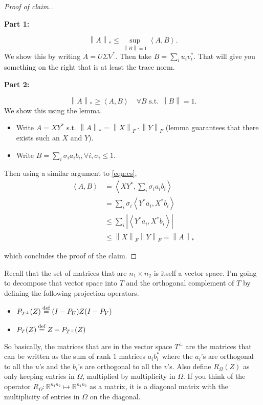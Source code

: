 \documentclass[11pt]{article}
\newcommand{\inprod}[1]{\left\langle #1 \right\rangle}
\newcommand{\eqdef}{\mathbin{\stackrel{\rm def}{=}}}
\newcommand{\norm}[1]{\left\| #1 \right\|}
\begin{document}
\begin{proof}[Proof of claim.] \ 

\noindent \textbf{Part 1:} 
\vspace{-2em}
\begin{adjustwidth}{0.5cm}{0pt}
\[ \norm{A}_* \le \sup_{\norm{B} =1} \inprod{A, B} . \]
We show this by writing 
$A = U \Sigma V^*$. Then take $B = \sum_i u_i v_i^*
$. That will give you something on the right that is at least the trace norm.
\end{adjustwidth}
\noindent\textbf{Part 2:}
\vspace{-2em}
\begin{adjustwidth}{0.5cm}{0pt}

 \[\norm{A}_* \ge \inprod{A,B} \hspace{1em} \forall B \text{ s.t. } \norm{B} = 1  . \]
We show this using the lemma.
\begin{itemize}
\item Write $A = XY^*$ s.t. $\norm{A}_* = \norm{X}_F \cdot \norm{Y}_F$ (lemma guarantees that there exists such an $X$ and $Y$).
\item Write $B = \sum_i \sigma_i a_i b_i, \forall i, \sigma_i \le 1$.
\end{itemize}
Then using a similar argument to \eqref{eqn:cs},
\vspace{-1em}\begin{align*}
\inprod{A,B} & = \inprod{XY^*, \sum_i \sigma_i a_i b_i} \\
& = \sum_i \sigma_i \inprod{Y^* a_i, X^* b_i } \\
&  \le \sum_i | \inprod{Y^* a_i, X^* b_i } | \\
& \le \norm{X}_F \norm{Y}_F = \norm{A}_*
\end{align*}
\end{adjustwidth}
which concludes the proof of the claim.
\end{proof}

Recall that the set of matrices that are $n_1 \times n_2$ is itself a vector space. I'm going to decompose that vector space into $T$ and the orthogonal complement of $T$ by defining the following projection operators.
\begin{itemize}
\item  $P_{T^\perp} (Z) \eqdef (I - P_U) Z (I - P_V)$ 
\item $P_T(Z) \eqdef Z - P_{T^\perp} ( Z)$
\end{itemize}
So basically, the matrices that are in the vector space $T^\perp$ are the matrices that can be written as the sum of rank 1 matrices $a_i b_i^*$ where the $a_i$'s are orthogonal to all the $u$'s and the $b_i$'s are orthogonal to all the $v$'s.
Also define $R_\Omega (Z)$ as only keeping entries in $\Omega$, multiplied by multiplicity in $\Omega$. If you think of the operator $R_\Omega: \mathbb{R}^{n_1 n_2} \mapsto \mathbb{R}^{n_1 n_2}$ as a matrix, it is a diagonal matrix with the multiplicity of entries in $\Omega$ on the diagonal.
\end{document}
